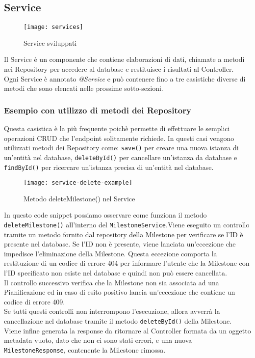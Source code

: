 \subsection{Service}
\begin{figure}[H] 
    \centering 
    \texttt{[image: services]} 
    \caption{Service sviluppati}
\end{figure}
Il Service è un componente che contiene elaborazioni di dati, chiamate a metodi nei Repository per accedere al database e restituisce i risultati al Controller.\\
Ogni Service è annotato \textit{@Service} e può contenere fino a tre casistiche diverse di metodi che sono elencati nelle prossime sotto-sezioni.

\subsubsection{Esempio con utilizzo di metodi dei Repository}
Questa casistica è la più frequente poichè permette di effettuare le semplici operazioni CRUD che l'endpoint solitamente richiede. In questi casi vengono utilizzati metodi dei Repository come: \texttt{save()} per creare una nuova istanza di un'entità nel database, \texttt{deleteById()} per cancellare un'istanza da database e \texttt{findById()} per ricercare un'istanza precisa di un'entità nel database.
\begin{figure}[H] 
    \centering 
    \texttt{[image: service-delete-example]} 
    \caption{Metodo deleteMilestone() nel Service}
\end{figure}
\noindent In questo code snippet possiamo osservare come funziona il metodo \texttt{deleteMilestone()} all'interno del \texttt{MilestoneService}.Viene eseguito un controllo tramite un metodo fornito dal repository della Milestone per verificare se l'ID è presente nel database. Se l'ID non è presente, viene lanciata un'eccezione che impedisce l'eliminazione della Milestone. Questa eccezione comporta la restituzione di un codice di errore 404 per informare l'utente che la Milestone con l'ID specificato non esiste nel database e quindi non può essere cancellata.\\
Il controllo successivo verifica che la Milestone non sia associata ad una Pianificazione ed in caso di esito positivo lancia un'eccezione che contiene un codice di errore 409.\\
Se tutti questi controlli non interrompono l'esecuzione, allora avverrà la cancellazione nel database tramite il metodo \texttt{deleteById()} della Milestone.\\
Viene infine generata la response da ritornare al Controller formata da un oggetto metadata vuoto, dato che non ci sono stati errori, e una nuova \texttt{MilestoneResponse}, contenente la Milestone rimossa.

